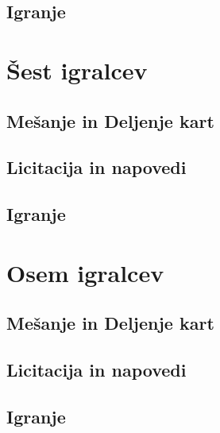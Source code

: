 \documentclass[a4paper, ]{report}
\begin{document}
\chapter{Igranje}

\part{Šest igralcev}

\chapter{Mešanje in Deljenje kart}
\chapter{Licitacija in napovedi}
\chapter{Igranje}

\part{Osem igralcev}

\chapter{Mešanje in Deljenje kart}
\chapter{Licitacija in napovedi}
\chapter{Igranje}
\end{document}
